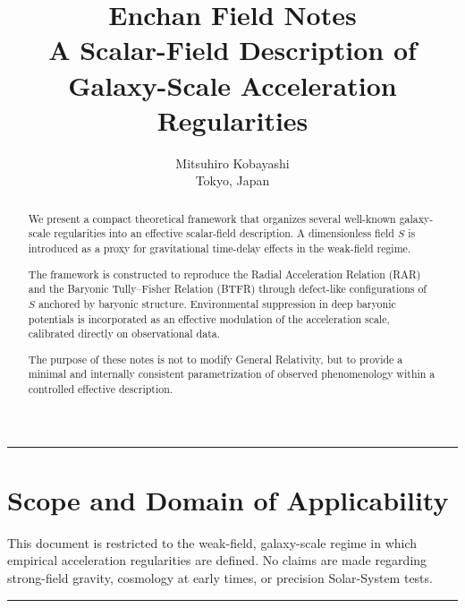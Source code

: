 \documentclass[11pt,a4paper]{article}
\title{\textbf{Enchan Field Notes \version}\\[0.5em]
\large A Scalar-Field Description of Galaxy-Scale Acceleration Regularities}
\author{Mitsuhiro Kobayashi\\
Tokyo, Japan}
\date{}
\newcommand{\EnchanS}{S}
\def\EnchanS{S}%
\begin{document}
\maketitle
\thispagestyle{empty}

\begin{abstract}
\noindent
We present a compact theoretical framework that organizes several well-known
galaxy-scale regularities into an effective scalar-field description.
A dimensionless field $\EnchanS$ is introduced as a proxy for gravitational
time-delay effects in the weak-field regime.

The framework is constructed to reproduce the Radial Acceleration Relation (RAR)
and the Baryonic Tully--Fisher Relation (BTFR) through defect-like configurations
of $\EnchanS$ anchored by baryonic structure.
Environmental suppression in deep baryonic potentials is incorporated as an
effective modulation of the acceleration scale, calibrated directly on
observational data.

The purpose of these notes is not to modify General Relativity, but to provide
a minimal and internally consistent parametrization of observed phenomenology
within a controlled effective description.
\end{abstract}

\vspace{1em}
\hrule
\section*{Scope and Domain of Applicability}
This document is restricted to the weak-field, galaxy-scale regime in which
empirical acceleration regularities are defined.
No claims are made regarding strong-field gravity, cosmology at early times,
or precision Solar-System tests.
\hrule
\vspace{1em}

\clearpage
\tableofcontents
\clearpage








\end{document}
